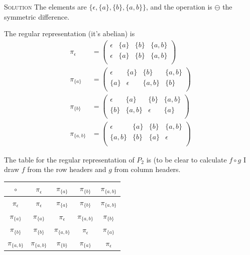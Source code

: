 \documentclass[twoside]{amsart}
\newcommand{\solution}{\textsc{Solution}\xspace}
\newcommand{\eps}{\ensuremath{\epsilon}\xspace}
\newcommand{\blank}{\vspace{5pt}}
\begin{document}
\begin{enumerate}[A.]
\begin{enumerate}[1]
      \blank \noindent \solution The elements are $\{\epsilon, \{a\}, \{b\},
      \{a,b\}\}$,
      and the operation is $\ominus$ the symmetric difference.

      The regular representation (it's abelian) is 
      \begin{align*}
         \pi_\eps &=
            \begin{pmatrix}
               \eps  &  \{a\}  & \{b\}  &  \{a,b\} \\
               \eps  &  \{a\}  & \{b\}  &  \{a,b\} \\
            \end{pmatrix} \\
         \pi_{\{a\}} &=
            \begin{pmatrix}
               \eps  &  \{a\}  & \{b\}  &  \{a,b\} \\
               \{a\} &  \eps   & \{a,b\}  &  \{b\} \\
            \end{pmatrix} \\
         \pi_{\{b\}} &=
            \begin{pmatrix}
               \eps  &  \{a\}  & \{b\}  &  \{a,b\} \\
               \{b\} &  \{a,b\}& \eps   &  \{a\} \\
            \end{pmatrix} \\
         \pi_{\{a,b\}} &=
            \begin{pmatrix}
               \eps  &  \{a\}  & \{b\}  &  \{a,b\} \\
             \{a,b\} &  \{b\}  & \{a\}  &  \eps \\
            \end{pmatrix}
      \end{align*}

      The table for the regular representation of $P_2$ is (to be clear
      to calculate $f \circ g$ I draw $f$ from the row headers and $g$
      from column headers.
      \begin{center}
      \begin{tabular}{c|cccc}
      $\circ$ & $\pi_\eps$ & $\pi_{\{a\}}$ & $\pi_{\{b\}}$ & $\pi_{\{a,b\}}$ \\ \hline
  $\pi_\eps$  & $\pi_\eps$ & $\pi_{\{a\}}$ & $\pi_{\{b\}}$ & $\pi_{\{a,b\}}$ \\ 
  $\pi_{\{a\}}$ & $\pi_{\{a\}}$ & $\pi_\eps$ & $\pi_{\{a,b\}}$ & $\pi_{\{b\}}$ \\ 
  $\pi_{\{b\}}$ & $\pi_{\{b\}}$ & $\pi_{\{a,b\}}$ & $\pi_\eps$ & $\pi_{\{a\}}$ \\ 
  $\pi_{\{a,b\}}$ & $\pi_{\{a,b\}}$ & $\pi_{\{b\}}$ & $\pi_{\{a\}}$ & $\pi_\eps$ \\ 
      \end{tabular}
      \end{center}


\end{enumerate}
\end{enumerate}
\end{document}

